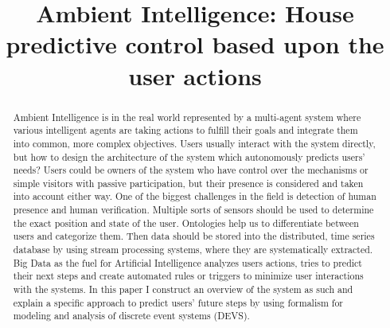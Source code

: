 \documentclass[ais]{iosart2x}
\begin{document}
\begin{frontmatter}

%
\title{Ambient Intelligence: House predictive control based upon the user actions}


\begin{aug}
\author[A]{ }
\author[B]{ }
\address[A]{Department of Intelligent Systems, , }
\end{aug}

\begin{abstract}
Ambient Intelligence is in the real world represented by a multi-agent system where various intelligent agents
are taking actions to fulfill their goals and integrate them into common, more complex objectives.
Users usually interact with the system directly, but how to design the architecture of the system which
autonomously predicts users' needs?
Users could be owners of the system who have control over the mechanisms or simple visitors with passive
participation, but their presence is considered and taken into account either way.
One of the biggest challenges in the field is detection of human presence and human verification.
Multiple sorts of sensors should be used to determine the exact position and state of the user.
Ontologies help us to differentiate between users and categorize them.
Then data should be stored into the distributed, time series database by using stream processing systems,
where they are systematically extracted.
Big Data as the fuel for Artificial Intelligence analyzes users actions, tries to predict their next steps
and create automated rules or triggers to minimize user interactions with the systems.
In this paper I construct an overview of the system as such and explain a specific approach to predict
users' future steps by using formalism for modeling and analysis of discrete event systems (DEVS).
\end{abstract}

\begin{keyword}
\end{keyword}
\end{frontmatter}
\end{document}
